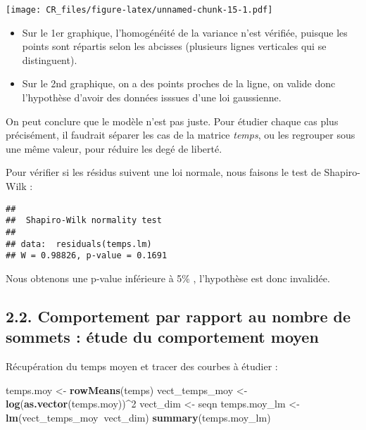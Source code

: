 \documentclass[
]{article}
\newenvironment{Shaded}{\begin{snugshade}}{\end{snugshade}}
\newcommand{\DecValTok}[1]{\textcolor[rgb]{0.00,0.00,0.81}{#1}}
\newcommand{\KeywordTok}[1]{\textcolor[rgb]{0.13,0.29,0.53}{\textbf{#1}}}
\newcommand{\NormalTok}[1]{#1}
\newcommand{\OperatorTok}[1]{\textcolor[rgb]{0.81,0.36,0.00}{\textbf{#1}}}
\newcommand{\StringTok}[1]{\textcolor[rgb]{0.31,0.60,0.02}{#1}}
\providecommand{\tightlist}{%
  \setlength{\itemsep}{0pt}\setlength{\parskip}{0pt}}
\begin{document}
\texttt{[image: CR\_files/figure-latex/unnamed-chunk-15-1.pdf]}

\begin{itemize}
\tightlist
\item
  Sur le 1er graphique, l'homogénéité de la variance n'est vérifiée,
  puisque les points sont répartis selon les abcisses (plusieurs lignes
  verticales qui se distinguent).
\item
  Sur le 2nd graphique, on a des points proches de la ligne, on valide
  donc l'hypothèse d'avoir des données isssues d'une loi gaussienne.
\end{itemize}

On peut conclure que le modèle n'est pas juste. Pour étudier chaque cas
plus précisément, il faudrait séparer les cas de la matrice
\emph{temps}, ou les regrouper sous une même valeur, pour réduire les
degé de liberté.

Pour vérifier si les résidus suivent une loi normale, nous faisons le
test de Shapiro-Wilk :

\begin{verbatim}
## 
##  Shapiro-Wilk normality test
## 
## data:  residuals(temps.lm)
## W = 0.98826, p-value = 0.1691
\end{verbatim}

Nous obtenons une p-value inférieure à 5\% , l'hypothèse est donc
invalidée.

\hypertarget{comportement-par-rapport-au-nombre-de-sommets-uxe9tude-du-comportement-moyen}{%
\subsection{2.2. Comportement par rapport au nombre de sommets : étude
du comportement
moyen}\label{comportement-par-rapport-au-nombre-de-sommets-uxe9tude-du-comportement-moyen}}

Récupération du temps moyen et tracer des courbes à étudier :

\begin{Shaded}
\begin{Highlighting}[]
\NormalTok{temps.moy <-}\StringTok{ }\KeywordTok{rowMeans}\NormalTok{(temps)}
\NormalTok{vect_temps_moy <-}\StringTok{ }\KeywordTok{log}\NormalTok{(}\KeywordTok{as.vector}\NormalTok{(temps.moy))}\OperatorTok{^}\DecValTok{2}
\NormalTok{vect_dim <-}\StringTok{ }\NormalTok{seqn}
\NormalTok{temps.moy_lm <-}\StringTok{ }\KeywordTok{lm}\NormalTok{(vect_temps_moy}\OperatorTok{~}\NormalTok{vect_dim)}
\KeywordTok{summary}\NormalTok{(temps.moy_lm)}
\end{Highlighting}
\end{Shaded}
\end{document}
